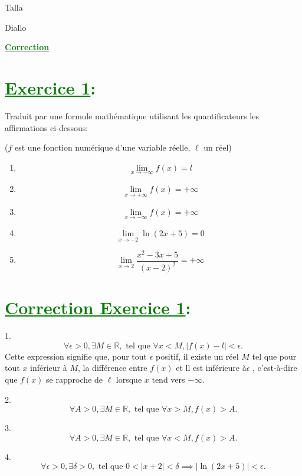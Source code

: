 \documentclass[12pt]{article}
\begin{document}
\begin{minipage}{0.8\textwidth}
	Talla                        
\end{minipage}
\begin{minipage}{0.8\textwidth}
	Diallo 
\end{minipage}

\begin{center}
\textbf{{\underline{\textcolor{green}{Correction}}}}
\end{center}
\section*{\textcolor{green}{\underline{Exercice 1}:}}
Traduit par une formule mathématique utilisant les quantificateurs les affirmations ci-dessous:

($f$ est une fonction numérique d'une variable réelle, $\ell$ un réel)
\begin{enumerate}
\item \[\lim_{x \to -\infty} f(x) = l\]

\item \[\lim_{x \to +\infty} f(x) = +\infty\]

\item \[\lim_{x \to -\infty} f(x) = +\infty\]

\item \[\lim_{x \to -2} \ln(2x+5) = 0\]

\item \[\lim_{x \to 2} \frac{x^{2}-3x+5}{(x-2)^{2}} = +\infty\]
\end{enumerate}
\section*{\textcolor{green}{\underline{Correction Exercice 1}:}}
1. 
\[
\forall \epsilon > 0, \exists M \in \mathbb{R}, \text{ tel que } \forall x < M, |f(x) - l| < \epsilon.
\]
Cette expression signifie que, pour tout $\epsilon$ positif, il existe un réel $M$ tel que pour tout $x$ inférieur à $M$, la différence entre $f(x)$ et ll est inférieure à$\epsilon$ , c'est-à-dire que $f(x)$ se rapproche de $\ell$ lorsque $x$ tend vers $-\infty$.

2.
\[
\forall A > 0, \exists M \in \mathbb{R}, \text{ tel que } \forall x > M, f(x) > A.
\]


3. 
\[
\forall A > 0, \exists M \in \mathbb{R}, \text{ tel que } \forall x < M, f(x) > A.
\]


4. 
\[
\forall \epsilon > 0, \exists \delta > 0, \text{ tel que } 0 < |x + 2| < \delta \implies |\ln(2x+5)| < \epsilon.
\]
\end{document}
